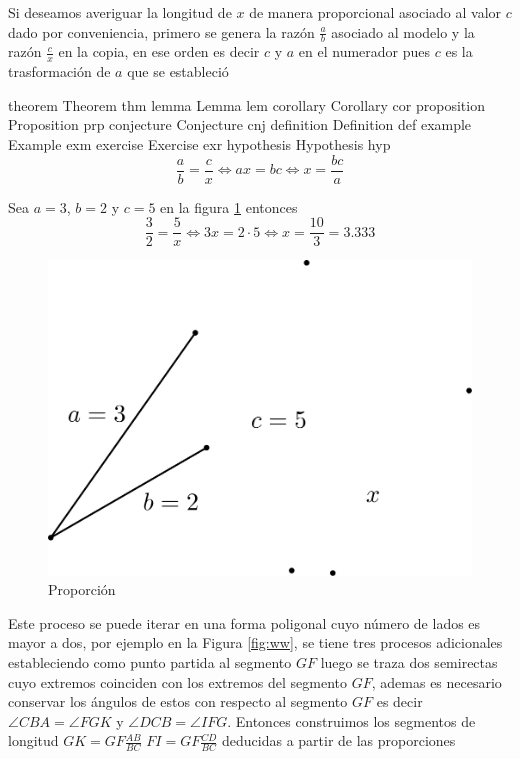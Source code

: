 \documentclass[
  11pt,
]{krantz}
\theoremstyle{definition}
\theoremstyle{definition}
\theoremstyle{definition}
\theoremstyle{definition}
\theoremstyle{remark}
\begin{document}
Si deseamos averiguar la longitud de \(x\) de manera proporcional asociado al valor \(c\) dado por conveniencia, primero se genera la razón \(\frac{a}{b}\) asociado al modelo y la razón \(\frac{c}{x}\) en la copia, en ese orden es decir \(c\) y \(a\) en el numerador pues \(c\) es la trasformación de \(a\) que se estableció

theorem Theorem thm
lemma Lemma lem
corollary Corollary cor
proposition Proposition prp
conjecture Conjecture cnj
definition Definition def
example Example exm
exercise Exercise exr
hypothesis Hypothesis hyp
\[
\frac{a}{b}=\frac{c}{x}\Longleftrightarrow ax=bc \Longleftrightarrow x=\frac{bc}{a}
\]

Sea \(a=3\), \(b=2\) y \(c=5\) en la figura \ref{fig:ww1} entonces\[
\frac{3}{2}=\frac{5}{x}\Longleftrightarrow 3x=2\cdot5 \Longleftrightarrow x=\frac{10}{3}=3.333
\]

\begin{figure}

{\centering \includegraphics{proporcion} 

}

\caption{Proporción}\label{fig:ww1}
\end{figure}

Este proceso se puede iterar en una forma poligonal cuyo número de lados es mayor a dos, por ejemplo en la Figura \ref{fig:ww}, se tiene tres procesos adicionales estableciendo como punto partida al segmento \(GF\) luego se traza dos semirectas cuyo extremos coinciden con los extremos del segmento \(GF\), ademas es necesario conservar los ángulos de estos con respecto al segmento \(GF\) es decir \(\angle CBA=\angle FGK\) y \(\angle DCB=\angle IFG\). Entonces construimos los segmentos de longitud \(GK=GF\frac{AB}{BC}\) \(FI=GF\frac{CD}{BC}\) deducidas a partir de las proporciones
\end{document}
